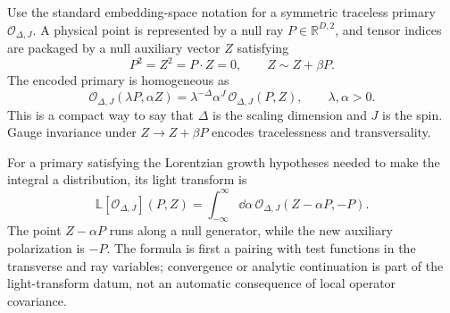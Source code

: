 Use the standard embedding-space notation for a symmetric traceless primary
\(\mathcal O_{\Delta,J}\).  A physical point is represented by a null ray
\(P\in\mathbb R^{D,2}\), and tensor indices are packaged by a null auxiliary
vector \(Z\) satisfying
\[
  P^2=Z^2=P\cdot Z=0,\qquad Z\sim Z+\beta P .
\]
The encoded primary is homogeneous as
\begin{equation}
  \mathcal O_{\Delta,J}(\lambda P,\alpha Z)
  =
  \lambda^{-\Delta}\alpha^J\,
  \mathcal O_{\Delta,J}(P,Z),
  \qquad \lambda,\alpha>0 .
  \label{eq:embedding-primary-homogeneity}
\end{equation}
This is a compact way to say that \(\Delta\) is the scaling dimension and
\(J\) is the spin.  Gauge invariance under \(Z\to Z+\beta P\) encodes
tracelessness and transversality.

For a primary satisfying the Lorentzian growth hypotheses needed to make the
integral a distribution, its light transform is
\begin{equation}
  \mathbb L[\mathcal O_{\Delta,J}](P,Z)
  =
  \int_{-\infty}^{\infty}\dd\alpha\,
  \mathcal O_{\Delta,J}(Z-\alpha P,-P).
  \label{eq:cft-light-transform-embedding}
\end{equation}
The point \(Z-\alpha P\) runs along a null generator, while the new auxiliary
polarization is \(-P\).  The formula is first a pairing with test functions
in the transverse and ray variables; convergence or analytic continuation is
part of the light-transform datum, not an automatic consequence of local
operator covariance.

